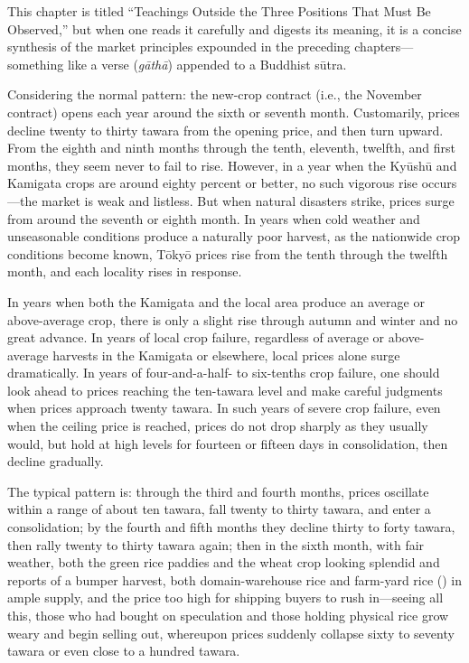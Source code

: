 \commentary
This chapter is titled ``Teachings Outside the Three Positions That Must
Be Observed,'' but when one reads it carefully and digests its meaning,
it is a concise synthesis of the market principles expounded in the
preceding chapters---something like a verse (\textit{g\=ath\=a})
appended to a Buddhist s\=utra.

Considering the normal pattern: the new-crop contract (i.e., the
November contract) opens each year around the sixth or seventh month.
Customarily, prices decline twenty to thirty tawara from the opening
price, and then turn upward. From the eighth and ninth months through
the tenth, eleventh, twelfth, and first months, they seem never to fail
to rise. However, in a year when the Ky\=ush\=u and Kamigata crops are
around eighty percent or better, no such vigorous rise occurs---the
market is weak and listless. But when natural disasters strike, prices
surge from around the seventh or eighth month. In years when cold
weather and unseasonable conditions produce a naturally poor harvest, as
the nationwide crop conditions become known, T\=oky\=o prices rise from
the tenth through the twelfth month, and each locality rises in
response.

In years when both the Kamigata and the local area produce an average or
above-average crop, there is only a slight rise through autumn and
winter and no great advance. In years of local crop failure, regardless
of average or above-average harvests in the Kamigata or elsewhere, local
prices alone surge dramatically. In years of four-and-a-half- to
six-tenths crop failure, one should look ahead to prices reaching the
ten-tawara level and make careful judgments when prices approach twenty
tawara. In such years of severe crop failure, even when the ceiling
price is reached, prices do not drop sharply as they usually would, but
hold at high levels for fourteen or fifteen days in consolidation, then
decline gradually.

The typical pattern is: through the third and fourth months, prices
oscillate within a range of about ten tawara, fall twenty to thirty
tawara, and enter a consolidation; by the fourth and fifth months they
decline thirty to forty tawara, then rally twenty to thirty tawara
again; then in the sixth month, with fair weather, both the green rice
paddies and the wheat crop looking splendid and reports of a bumper
harvest, both domain-warehouse rice and farm-yard rice ()
in ample supply, and the price too high for shipping buyers to rush
in---seeing all this, those who had bought on speculation and those
holding physical rice grow weary and begin selling out, whereupon prices
suddenly collapse sixty to seventy tawara or even close to a hundred
tawara.


